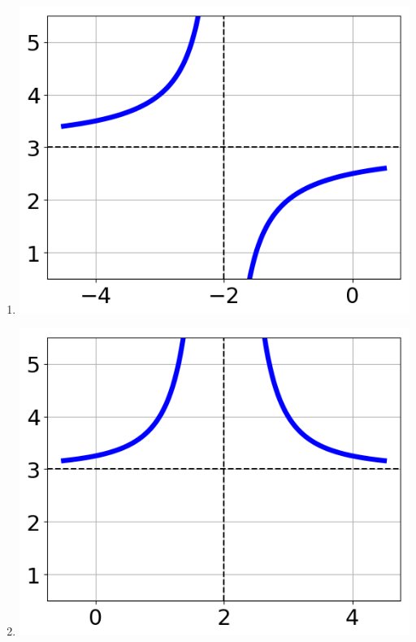 \documentclass{article}[10pt]
\begin{document}
\begin{enumerate}[label=\Alph*.]
\item  
\begin{center}\includegraphics[scale=0.5]{../Figures/question35MUD.png}\end{center} 
 
\item  
\begin{center}\includegraphics[scale=0.5]{../Figures/question35MUA.png}\end{center} 
 

\end{enumerate}
\end{document}
